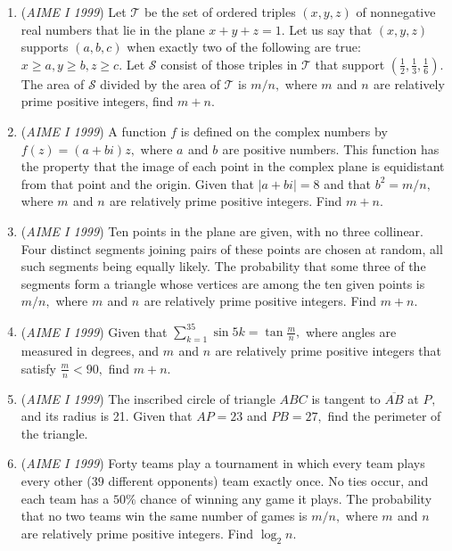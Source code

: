 \begin{enumerate}
 

	\item (\textit{AIME I 1999}) Let $\mathcal{T}$ be the set of ordered triples $(x,y,z)$ of nonnegative real numbers that lie in the plane $x+y+z=1.$  Let us say that $(x,y,z)$ supports $(a,b,c)$ when exactly two of the following are true: $x\ge a, y\ge b, z\ge c.$  Let $\mathcal{S}$ consist of those triples in $\mathcal{T}$ that support $\left(\frac 12,\frac 13,\frac 16\right).$  The area of $\mathcal{S}$ divided by the area of $\mathcal{T}$ is $m/n,$  where $m_{}$ and $n_{}$ are relatively prime positive integers, find $m+n.$


	\item (\textit{AIME I 1999}) A function $f$ is defined on the complex numbers by $f(z)=(a+bi)z,$ where $a_{}$ and $b_{}$ are positive numbers.  This function has the property that the image of each point in the complex plane is equidistant from that point and the origin.  Given that $|a+bi|=8$ and that $b^2=m/n,$ where $m_{}$ and $n_{}$ are relatively prime positive integers.  Find $m+n.$


	\item (\textit{AIME I 1999}) Ten points in the plane are given, with no three collinear.  Four distinct segments joining pairs of these points are chosen at random, all such segments being equally likely.  The probability that some three of the segments form a triangle whose vertices are among the ten given points is $m/n,$ where $m_{}$ and $n_{}$ are relatively prime positive integers.  Find $m+n.$


	\item (\textit{AIME I 1999}) Given that $\sum_{k=1}^{35}\sin 5k=\tan \frac mn,$ where angles are measured in degrees, and $m_{}$ and $n_{}$ are relatively prime positive integers that satisfy $\frac mn<90,$ find $m+n.$


	\item (\textit{AIME I 1999}) The inscribed circle of triangle $ABC$ is tangent to $\overline{AB}$ at $P_{},$  and its radius is 21.  Given that $AP=23$ and $PB=27,$ find the perimeter of the triangle.


 

	\item (\textit{AIME I 1999}) Forty teams play a tournament in which every team plays every other ($39$ different opponents) team exactly once.  No ties occur, and each team has a $50 \%$ chance of winning any game it plays.  The probability that no two teams win the same number of games is $m/n,$ where $m_{}$ and $n_{}$ are relatively prime positive integers.  Find $\log_2 n.$



\end{enumerate}
